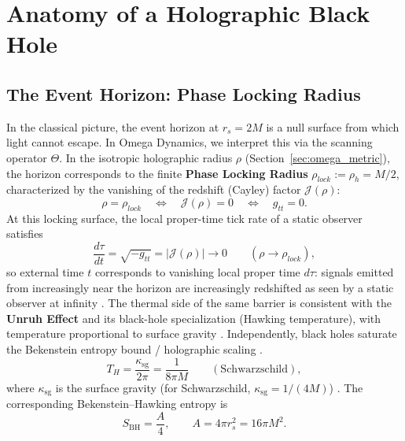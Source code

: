\section{Anatomy of a Holographic Black Hole}
\label{sec:black_hole_anatomy}

\subsection{The Event Horizon: Phase Locking Radius}
In the classical picture, the event horizon at $r_s = 2M$ is a null surface from which light cannot escape. In Omega Dynamics, we interpret this via the scanning operator $\Theta$.
In the isotropic holographic radius $\rho$ (Section~\ref{sec:omega_metric}), the horizon corresponds to the finite \textbf{Phase Locking Radius} $\rho_{lock}:=\rho_h=M/2$, characterized by the vanishing of the redshift (Cayley) factor $\mathcal{J}(\rho)$:
\begin{equation}
  \rho=\rho_{lock}\quad \Longleftrightarrow\quad \mathcal{J}(\rho)=0 \quad \Longleftrightarrow\quad g_{tt}=0 .
\end{equation}
At this locking surface, the local proper-time tick rate of a static observer satisfies
\begin{equation}
  \frac{d\tau}{dt}=\sqrt{-g_{tt}}=|\mathcal{J}(\rho)| \to 0 \qquad (\rho\to \rho_{lock}),
\end{equation}
so external time $t$ corresponds to vanishing local proper time $d\tau$: signals emitted from increasingly near the horizon are increasingly redshifted as seen by a static observer at infinity \cite{Wald1984}. The thermal side of the same barrier is consistent with the \textbf{Unruh Effect} \cite{Unruh1976} and its black-hole specialization (Hawking temperature), with temperature proportional to surface gravity \cite{Hawking1975,HartleHawking1976,BirrellDavies1982,Wald1994}. Independently, black holes saturate the Bekenstein entropy bound / holographic scaling \cite{Bekenstein1973, tHooft1993, Susskind1995}.
\begin{equation}
  T_H = \frac{\kappa_{\mathrm{sg}}}{2\pi}=\frac{1}{8\pi M}\qquad(\text{Schwarzschild}),
\end{equation}
where $\kappa_{\mathrm{sg}}$ is the surface gravity (for Schwarzschild, $\kappa_{\mathrm{sg}}=1/(4M)$) \cite{Wald1984}.
The corresponding Bekenstein--Hawking entropy is \cite{Bekenstein1973, Hawking1975, Bousso2002}
\begin{equation}
  S_{\mathrm{BH}}=\frac{A}{4},\qquad A=4\pi r_s^2=16\pi M^2 .
\end{equation}

